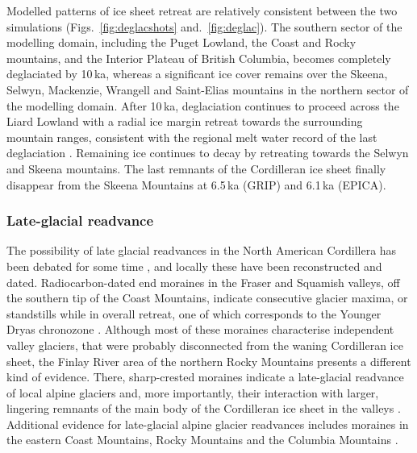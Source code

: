 \documentclass[tc]{copernicus}
\begin{document}
Modelled patterns of ice sheet retreat are relatively consistent between the
two simulations (Figs.~\ref{fig:deglacshots} and.~\ref{fig:deglac}). The
southern sector of the modelling domain, including the Puget Lowland, the Coast
and Rocky mountains, and the Interior Plateau of British Columbia, becomes
completely deglaciated by 10\,ka, whereas a significant ice cover remains over
the Skeena, Selwyn, Mackenzie, Wrangell and Saint-Elias mountains in the
northern sector of the modelling domain. After 10\,ka, deglaciation continues
to proceed across the Liard Lowland with a radial ice margin retreat towards
the surrounding mountain ranges, consistent with the regional melt water record
of the last deglaciation \citep{Margold.etal.2013}. Remaining ice continues to
decay by retreating towards the Selwyn and Skeena mountains. The last remnants
of the Cordilleran ice sheet finally disappear from the Skeena Mountains at
6.5\,ka (GRIP) and 6.1\,ka (EPICA).

\subsubsection{Late-glacial readvance}

The possibility of late glacial readvances in the North American Cordillera has
been debated for some time \citep{Osborn.Gerloff.1997}, and locally these have
been reconstructed and dated. Radiocarbon-dated end moraines in the Fraser and
Squamish valleys, off the southern tip of the Coast Mountains, indicate
consecutive glacier maxima, or standstills while in overall retreat, one of
which corresponds to the Younger Dryas chronozone \citep{Clague.etal.1997,
Friele.Clague.2002, Friele.Clague.2002a, Kovanen.2002,
Kovanen.Easterbrook.2002}. Although most of these moraines characterise
independent valley glaciers, that were probably disconnected from the waning
Cordilleran ice sheet, the Finlay River
area of the northern Rocky Mountains presents a different kind of evidence.
There, sharp-crested moraines indicate a late-glacial readvance of local alpine
glaciers and, more importantly, their interaction with larger, lingering
remnants of the main body of the Cordilleran ice sheet in the valleys
\citep{Lakeman.etal.2008}. Additional evidence for late-glacial
alpine glacier readvances includes moraines in the eastern Coast Mountains,
Rocky Mountains and the Columbia Mountains \citep{Osborn.Gerloff.1997,
Menounos.etal.2008}.
\end{document}
